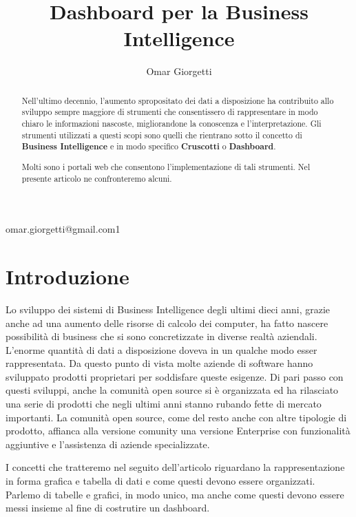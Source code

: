 \documentclass{ium}
\begin{document}
 
\title{Dashboard per la Business Intelligence}
\author{Omar Giorgetti}{omar.giorgetti@gmail.com}{1}
\markboth{{}}{} 
\markright{\thesection\ {}}
\begin{abstract}

Nell'ultimo decennio, l'aumento spropositato dei dati a disposizione ha contribuito allo sviluppo sempre maggiore di strumenti che consentissero di rappresentare in modo chiaro le informazioni nascoste, migliorandone la conoscenza e l'interpretazione.
Gli strumenti utilizzati a questi scopi sono quelli che rientrano sotto il concetto di \textbf{Business Intelligence} e in modo specifico \textbf{Cruscotti} o \textbf{Dashboard}.

Molti sono i portali web che consentono l'implementazione di tali strumenti. Nel presente articolo ne confronteremo alcuni.

\end{abstract}


%
%


\section{Introduzione}

Lo sviluppo dei sistemi di Business Intelligence degli ultimi dieci anni, grazie anche ad una aumento delle risorse di calcolo dei computer, ha fatto nascere possibilità di business che si sono concretizzate in diverse realtà aziendali. L'enorme quantità di dati a disposizione doveva in un qualche modo esser rappresentata. Da questo punto di vista molte aziende di software hanno sviluppato prodotti proprietari per soddisfare queste esigenze. Di pari passo con questi sviluppi, anche la comunità open source si è organizzata ed ha rilasciato una serie di prodotti che negli ultimi anni stanno rubando fette di mercato importanti. La comunità open source, come del resto anche con altre tipologie di prodotto, affianca alla versione comunity una versione Enterprise con funzionalità aggiuntive e l'assistenza di aziende specializzate.

I concetti che tratteremo nel seguito dell'articolo riguardano la rappresentazione in forma grafica e tabella di dati e come questi devono essere organizzati. Parlemo di tabelle e grafici, in modo unico, ma anche come questi devono essere messi insieme al fine di costrutire un dashboard.
\end{document}
